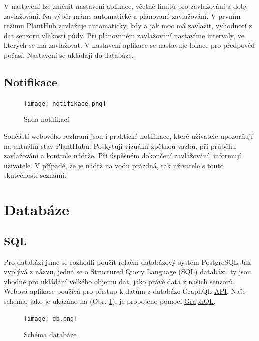 \documentclass[czech,12pt,a4paper]{article}
\begin{document}
V nastavení lze změnit nastavení aplikace, včetně limitů pro zavlažování a doby zavlažování. Na výběr máme automatické a plánované zavlažování. V prvním režimu PlantHub zavlažuje automaticky, kdy a jak moc má zavlažit, vyhodnotí z dat senzoru vlhkosti půdy. Při plánovaném zavlažování nastavíme intervaly, ve kterých se má zavlažovat. V nastavení aplikace se nastavuje lokace pro předpověď počasí. Nastavení se ukládají do databáze.

\clearpage

\subsection{Notifikace}

\begin{figure}[h]
	\centering
	\texttt{[image: notifikace.png]}
	\caption{Sada notifikací}
\end{figure}

Součástí webového rozhraní jsou i praktické notifikace, které uživatele upozorňují na aktuální stav PlantHubu. Poskytují vizuální zpětnou vazbu, při průběhu zavlažování a kontrole nádrže. Při úspěšném dokončení zavlažování, informují uživatele. V případě, že je nádrž na vodu prázdná, tak uživatele s touto skutečností seznámí.

\clearpage

\section{Databáze} \label{secDB}

\subsection{SQL}

Pro databázi jsme se rozhodli použít relační databázový systém PostgreSQL.\@ Jak vyplývá z názvu, jedná se o Structured Query Language (SQL) databázi, ty jsou vhodné pro ukládání velkého objemu dat, jako právě data z našich senzorů. Webová aplikace používá pro přístup k datům z databáze \ac{GraphQL} \space \underline{\ac{API}}. Naše schéma, jako je ukázáno na (Obr. \ref{fig:schemaDB}), je propojeno pomocí \underline{\ac{GraphQL}}.

\vspace*{1cm}
\begin{figure}[h]
	\centering
	\texttt{[image: db.png]}
	\caption{Schéma databáze}
	\label{fig:schemaDB}
\end{figure}
\end{document}
